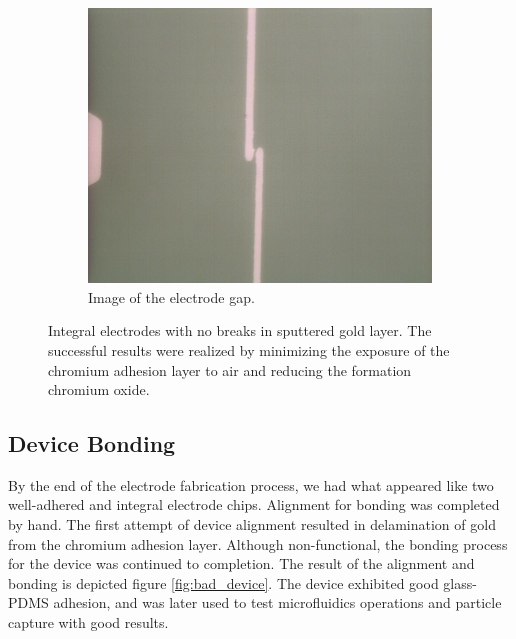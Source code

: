 \begin{figure}[h]
\begin{subfigure}[b]{0.45\textwidth}
        \includegraphics[width=\textwidth]{images/goodElectrodeCloseUp.png}
        \caption{Image of the electrode gap.}
    \end{subfigure}
    \caption{Integral electrodes with no breaks in sputtered gold layer. The successful results were realized by minimizing the exposure of the chromium adhesion layer to air and reducing the formation chromium oxide.}
    \label{fig:good_electrodes}
\end{figure}


\FloatBarrier

\subsection{Device Bonding}

\par By the end of the electrode fabrication process, we had what appeared like two well-adhered and integral electrode chips. Alignment for bonding was completed by hand. The first attempt of device alignment resulted in delamination of gold from the chromium adhesion layer. Although non-functional, the bonding process for the device was continued to completion. The result of the alignment and bonding is depicted figure \ref{fig:bad_device}. The device exhibited good glass-PDMS adhesion, and was later used to test microfluidics operations and particle capture with good results.


